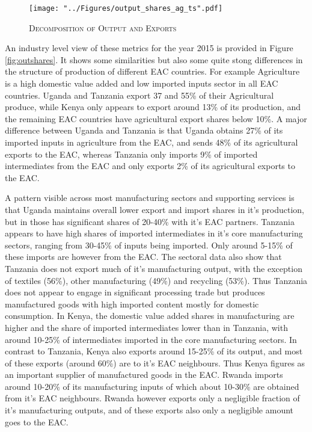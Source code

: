 \documentclass[a4paper]{article}
\begin{document}
\begin{figure}[h!]
\centering
\caption{\label{fig:outshares_ag_ts}\textsc{Decomposition of Output and Exports}}
\texttt{[image: "../Figures/output\_shares\_ag\_ts".pdf]} %
\end{figure}
\FloatBarrier

An industry level view of these metrics for the year 2015 is provided in Figure \ref{fig:outshares}. It shows some similarities but also some quite stong differences in the structure of production of different EAC countries. For example Agriculture is a high domestic value added and low imported inputs sector in all EAC countries. Uganda and Tanzania export 37 and 55\% of their Agricultural produce, while Kenya only appears to export around 13\% of its production, and the remaining EAC countries have agricultural export shares below 10\%. A major difference between Uganda and Tanzania is that Uganda obtains 27\% of its imported inputs in agriculture from the EAC, and sends 48\% of its agricultural exports to the EAC, whereas Tanzania only imports 9\% of imported intermediates from the EAC and only exports 2\% of its agricultural exports to the EAC. \newline

A pattern visible across most manufacturing sectors and supporting services is that Uganda maintains overall lower export and import shares in it's production, but in those has significant shares of 20-40\% with it's EAC partners. Tanzania appears to have high shares of imported intermediates in it's core manufacturing sectors, ranging from 30-45\% of inputs being imported. Only around 5-15\% of these imports are however from the EAC. The sectoral data also show that Tanzania does not export much of it's manufacturing output, with the exception of textiles (56\%), other manufacturing (49\%) and recycling (53\%). Thus Tanzania does not appear to engage in significant processing trade but produces manufactured goods with high imported content mostly for domestic consumption. In Kenya, the domestic value added shares in manufacturing are higher and the share of imported intermediates lower than in Tanzania, with around 10-25\% of intermediates imported in the core manufacturing sectors. In contrast to Tanzania, Kenya also exports around 15-25\% of its output, and most of these exports (around 60\%) are to it's EAC neighbours. Thus Kenya figures as an important supplier of manufactured goods in the EAC. Rwanda imports around 10-20\% of its manufacturing inputs of which about 10-30\% are obtained from it's EAC neighbours. Rwanda however exports only a negligible fraction of it's manufacturing outputs, and of these exports also only a negligible amount goes to the EAC. \newline
\end{document}

